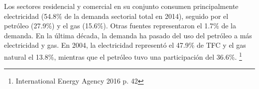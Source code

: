 \documentclass[]{article}
\begin{document}
Los sectores residencial y comercial en su conjunto consumen principalmente electricidad (54.8$\%$ de la demanda sectorial total en 2014), seguido por el petróleo (27.9$\%$) y el gas (15.6$\%$). Otras fuentes representaron el 1.7$\%$ de la demanda. En la última década, la demanda ha pasado del uso del petróleo a más electricidad y gas. En 2004, la electricidad representó el 47.9$\%$ de TFC y el gas natural el 13.8$\%$, mientras que el petróleo tuvo una participación del 36.6$\%$. \citep{InternationalEnergyAgency2016}\footnote{International Energy Agency 2016 p. 42}\\

 
 
 
 






\end{document}
